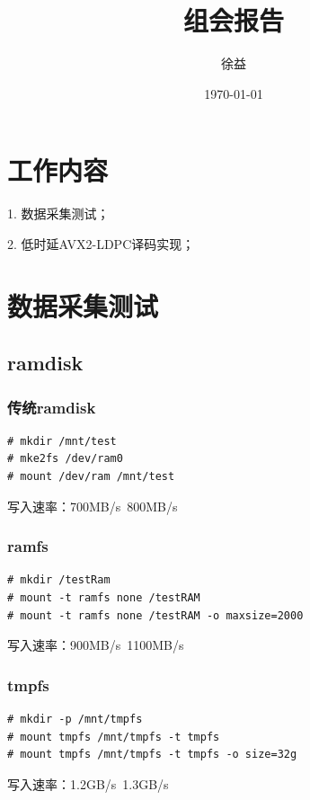 \documentclass{article}
\title{组会报告}
\author{徐益}
\date{\today}
\begin{document}
\maketitle


\section{工作内容}
1. 数据采集测试；

2. 低时延AVX2-LDPC译码实现；


\section{数据采集测试}
\subsection{ramdisk}
\subsubsection{传统ramdisk}
\begin{lstlisting}
# mkdir /mnt/test
# mke2fs /dev/ram0
# mount /dev/ram /mnt/test
\end{lstlisting}
写入速率：700MB/s~800MB/s
\subsubsection{ramfs}
\begin{lstlisting}
# mkdir /testRam
# mount -t ramfs none /testRAM
# mount -t ramfs none /testRAM -o maxsize=2000
\end{lstlisting}
写入速率：900MB/s~1100MB/s
\subsubsection{tmpfs}
\begin{lstlisting}
# mkdir -p /mnt/tmpfs
# mount tmpfs /mnt/tmpfs -t tmpfs
# mount tmpfs /mnt/tmpfs -t tmpfs -o size=32g
\end{lstlisting}
写入速率：1.2GB/s~1.3GB/s
\end{document}
